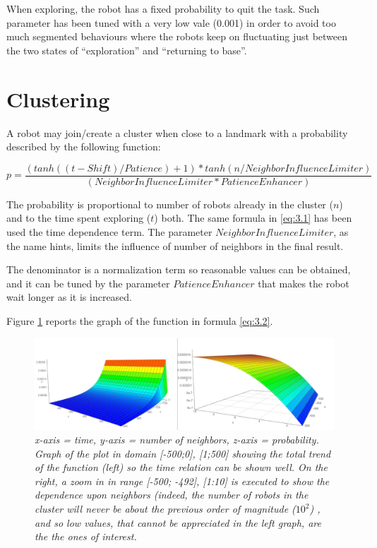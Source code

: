 \smallskip
When exploring, the robot has a fixed probability to quit the task. Such parameter has been tuned with a very low vale (0.001) in order to avoid too much segmented behaviours where the robots keep on fluctuating just between the two states of ``exploration'' and ``returning to base''.  

\section{Clustering}

A robot may join/create a cluster when close to a landmark with a probability described by the following function:

\begin{equation}
    p =  \frac{(tanh((t - Shift) / Patience) + 1) * tanh(n / NeighborInfluenceLimiter)}{(NeighborInfluenceLimiter * PatienceEnhancer)} \tag{3.2}\label{eq:3.2}
\end{equation}

The probability is proportional to number of robots already in the cluster ($n$) and to the time spent exploring ($t$) both. The same formula in \ref{eq:3.1} has been used the time dependence term. 
The parameter $NeighborInfluenceLimiter$, as the name hints, limits the influence of number of neighbors in the final result.

\noindent
The denominator is a normalization term so reasonable values can be obtained, and it can be tuned by the parameter $PatienceEnhancer$ that makes the robot wait longer as it is increased.

\noindent
Figure \ref{fig:cluster-join} reports the graph of the function in formula \ref{eq:3.2}.

\begin{figure}[H]
\centering
\includegraphics[width=\linewidth]{images/cluster_join.png}
\caption{\textit{x-axis = time, y-axis = number of neighbors, z-axis = probability. Graph of the plot in domain [-500;0], [1;500]  showing the total trend of the function (left) so the time relation can be shown well. On the right, a zoom in in range [-500; -492], [1:10] is executed to show the dependence upon neighbors (indeed, the number of robots in the cluster will never be about the previous order of magnitude ($10^2$) , and so low values, that cannot be appreciated in the left graph, are the the ones of interest.}}
\label{fig:cluster-join}
\end{figure}

